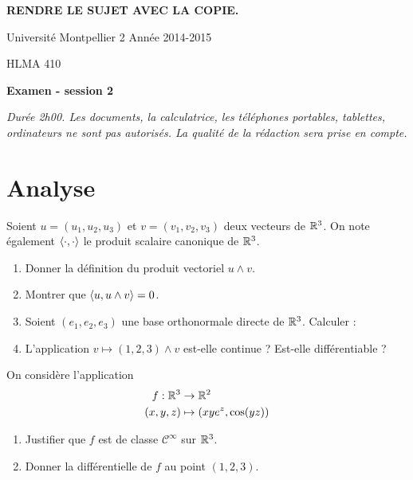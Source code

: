 \documentclass{article}
\begin{document}
\begin{center}
{\large \sffamily\bfseries RENDRE LE SUJET AVEC LA COPIE. }
\end{center}



\noindent Université Montpellier 2 \hfill Année 2014-2015

\noindent HLMA 410
 


\bigskip

\begin{center}
{\large \sffamily\bfseries Examen - session 2}
\end{center}

\textit{Durée 2h00. Les documents, la calculatrice, les téléphones portables, tablettes, ordinateurs ne sont pas autorisés. La qualité de la rédaction sera prise en compte.} 

\bigskip
\bigskip

\section{Analyse}

Soient $u=(u_1,u_2,u_3)$ et $v = (v_1,v_2,v_3)$ deux vecteurs de $\mathbb{R}^3$.  On note également $\left\langle \cdot,\cdot\right\rangle$ le produit scalaire canonique de $\mathbb{R}^3$.
\begin{enumerate}
	\item Donner la définition du produit vectoriel $u\wedge v$.
	\item Montrer que $\left\langle u, u\wedge v\right\rangle  = 0$.
	\item Soient $(e_1,e_2,e_3)$ une base orthonormale directe de $\mathbb{R}^3$. Calculer : \\
		\item L'application $ v \mapsto (1,2,3) \wedge v$ est-elle continue ? Est-elle différentiable ?
\end{enumerate}

\bigskip

\exo{}
On considère l'application 
\begin{align*}
	f : \mathbb{R}^3 & \to \mathbb{R}^2 \\
(x,y,z) & \mapsto (xye^z,\cos(yz))
\end{align*}
\begin{enumerate}
	\item Justifier que $f$ est de classe $\mathcal C^\infty$ sur $\mathbb{R}^3$.
	\item Donner la différentielle de $f$ au point $(1,2,3)$.
\end{enumerate}
\end{document}
